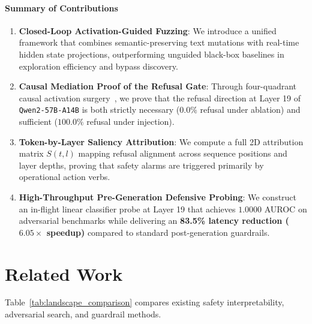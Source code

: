 \documentclass[manuscript,screen,review,anonymous]{acmart}
\begin{document}
\paragraph{Summary of Contributions}
\begin{enumerate}[leftmargin=*]
    \item \textbf{Closed-Loop Activation-Guided Fuzzing}: We introduce a unified framework that combines semantic-preserving text mutations with real-time hidden state projections, outperforming unguided black-box baselines in exploration efficiency and bypass discovery.
    \item \textbf{Causal Mediation Proof of the Refusal Gate}: Through four-quadrant causal activation surgery~\cite{pearl2009causality,vig2020causal,geiger2021causal,meng2022locating}, we prove that the refusal direction at Layer 19 of \texttt{Qwen2-57B-A14B} is both strictly necessary ($0.0\%$ refusal under ablation) and sufficient ($100.0\%$ refusal under injection).
    \item \textbf{Token-by-Layer Saliency Attribution}: We compute a full 2D attribution matrix $S(t, l)$ mapping refusal alignment across sequence positions and layer depths, proving that safety alarms are triggered primarily by operational action verbs.
    \item \textbf{High-Throughput Pre-Generation Defensive Probing}: We construct an in-flight linear classifier probe at Layer 19 that achieves $1.0000$ AUROC on adversarial benchmarks while delivering an \textbf{83.5\% latency reduction ($6.05\times$ speedup)} compared to standard post-generation guardrails.
\end{enumerate}

\section{Related Work}
Table~\ref{tab:landscape_comparison} compares existing safety interpretability, adversarial search, and guardrail methods.
\end{document}
